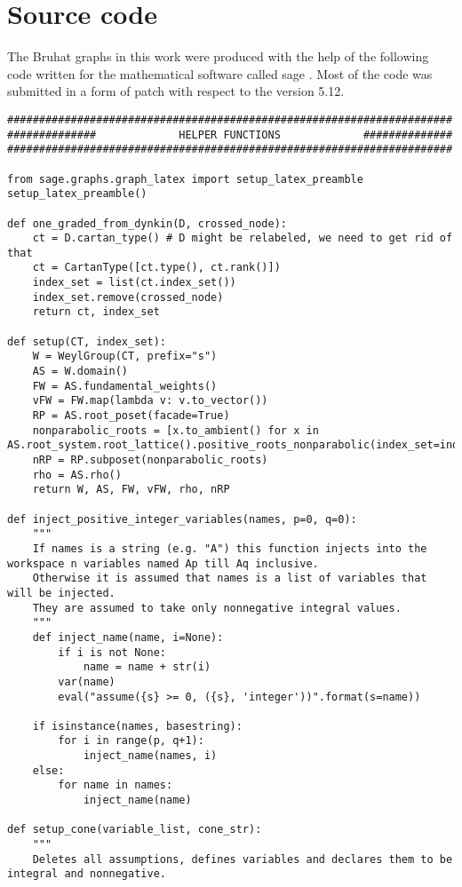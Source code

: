 \chapter{Source code}\label{app:source}
The Bruhat graphs in this work were produced with the help of the following code written for the mathematical software called sage \cite{sage}. Most of the code was submitted in a form of patch with respect to the version 5.12.

\begin{verbatim}
######################################################################
##############             HELPER FUNCTIONS             ##############
######################################################################

from sage.graphs.graph_latex import setup_latex_preamble
setup_latex_preamble()

def one_graded_from_dynkin(D, crossed_node):
    ct = D.cartan_type() # D might be relabeled, we need to get rid of that
    ct = CartanType([ct.type(), ct.rank()])
    index_set = list(ct.index_set())
    index_set.remove(crossed_node)
    return ct, index_set

def setup(CT, index_set):
    W = WeylGroup(CT, prefix="s")
    AS = W.domain()
    FW = AS.fundamental_weights()
    vFW = FW.map(lambda v: v.to_vector())
    RP = AS.root_poset(facade=True)
    nonparabolic_roots = [x.to_ambient() for x in AS.root_system.root_lattice().positive_roots_nonparabolic(index_set=index_set)]
    nRP = RP.subposet(nonparabolic_roots)
    rho = AS.rho()
    return W, AS, FW, vFW, rho, nRP

def inject_positive_integer_variables(names, p=0, q=0):
    """
    If names is a string (e.g. "A") this function injects into the workspace n variables named Ap till Aq inclusive.
    Otherwise it is assumed that names is a list of variables that will be injected.
    They are assumed to take only nonnegative integral values.
    """
    def inject_name(name, i=None):
        if i is not None:
            name = name + str(i)
        var(name)
        eval("assume({s} >= 0, ({s}, 'integer'))".format(s=name))

    if isinstance(names, basestring):
        for i in range(p, q+1):
            inject_name(names, i)
    else:
        for name in names:
            inject_name(name)

def setup_cone(variable_list, cone_str):
    """
    Deletes all assumptions, defines variables and declares them to be integral and nonnegative.


\end{verbatim}
